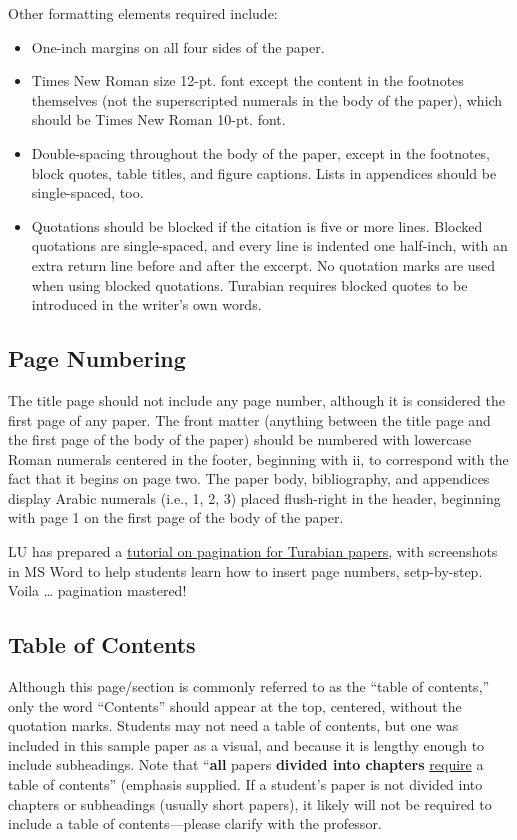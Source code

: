 \documentclass[raggedright]{turabian-researchpaper}
\newcommand*{\bluehref}[2]{\href{#1}{\color{blue}\underline{#2}}}
\begin{document}
Other formatting elements required include:
\begin{itemize}
\item One-inch margins on all four sides of the paper.
\item Times New Roman size 12-pt. font except the content in the footnotes
  themselves (not the superscripted numerals in the body of the paper), which
  should be Times New Roman 10-pt. font.
\item Double-spacing throughout the body of the paper, except in the footnotes,
  block quotes, table titles, and figure captions. Lists in appendices should be
  single-spaced, too.\autocite[373]{Turabian}
\item Quotations should be blocked if the citation is five or more lines.
  Blocked quotations are single-spaced, and every line is indented one
  half-inch, with an extra return line before and after the excerpt. No
  quotation marks are used when using blocked quotations. Turabian requires
  blocked quotes to be introduced in the writer's own
  words.\autocite[349]{Turabian}
\end{itemize}

\subsection{Page Numbering}

The title page should not include any page number, although it is considered the
first page of any paper. The front matter (anything between the title page and
the first page of the body of the paper) should be numbered with lowercase Roman
numerals centered in the footer, beginning with ii, to correspond with the fact
that it begins on page two. The paper body, bibliography, and appendices display
Arabic numerals (i.e., 1, 2, 3) placed flush-right in the
header,\autocite[374]{Turabian} beginning with page 1 on the first page of the
body of the paper.

LU has prepared a
\bluehref{http://www.liberty.edu/media/1171/CMO_-_Pagination_Tutorial_for_Turabian_-_edited_by_Sam_-_02022017.pdf}{tutorial
on pagination for Turabian papers}, with screenshots in MS Word to help students
learn how to insert page numbers, setp-by-step. Voila \dots{} pagination
mastered!

\subsection{Table of Contents}

Although this page/section is commonly referred to as the ``table of contents,''
only the word ``Contents'' should appear at the top, centered, without the
quotation marks. Students may not need a table of contents, but one was included
in this sample paper as a visual, and because it is lengthy enough to include
subheadings. Note that ``\textbf{all} papers \textbf{divided into chapters}
\underline{require} a table of contents'' (emphasis
supplied.\autocite[380]{Turabian} If a student's paper is not divided into
chapters or subheadings (usually short papers), it likely will not be required
to include a table of contents---please clarify with the professor.
\end{document}
